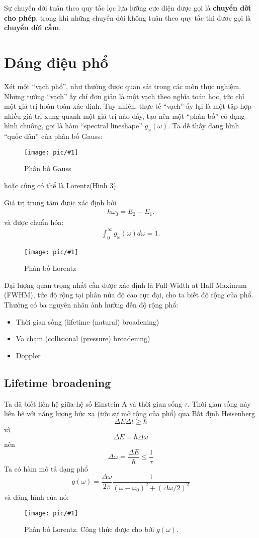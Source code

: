 \documentclass{article}
\newcommand{\image}[2]{
	\begin{figure}[h!]
		\centering
		\texttt{[image: pic/\#1]}
		\caption{#2}
	\end{figure}
}
\begin{document}
Sự chuyển dời tuân theo quy tắc lọc lựa lưỡng cực điện được gọi là \textbf{chuyển dời cho phép}, trong khi những chuyển dời không tuân theo quy tắc thì đươc gọi là \textbf{chuyển dời cấm}.

\section{Dáng điệu phổ}

Xét một ``vạch phổ'', như thường được quan sát trong các môn thực nghiệm. Những tưởng ``vạch'' ấy chỉ đơn giản là một vạch theo nghĩa toán học, tức chỉ một giá trị hoàn toàn xác định. Tuy nhiên, thực tế ``vạch'' ấy lại là một tập hợp nhiều giá trị xung quanh một giá trị nào đấy, tạo nên một ``phân bố'' có dạng hình chuông, gọi là hàm ``spectral lineshape'' $g_\omega(\omega)$.
Ta dễ thấy dạng hình ``quốc dân'' của phân bố Gauss:
\image{gauss.jpg}{Phân bố Gauss}

hoặc cũng có thể là Lorentz(Hình 3).

Giá trị trung tâm được xác định bởi 
\begin{align*}
	\hbar\omega_0 = E_2 - E_1.
\end{align*} 
và được chuẩn hóa:
\begin{align*}
	\int_{0}^{\infty}g_\omega(\omega)d\omega = 1.
\end{align*}

\image{cauchy.png}{Phân bố Lorentz}

Đại lượng quan trọng nhất cần được xác định là Full Width at Half Maximum (FWHM), tức độ rộng tại phân nửa độ cao cực đại, cho ta biết độ rộng của phổ.\\
Thường có ba nguyên nhân ảnh hưởng đến độ rộng phổ:
\begin{itemize}
	\item Thời gian sống (lifetime (natural) broadening)
	\item Va chạm (collisional (pressure) broadening)
	\item Doppler
\end{itemize}
\subsection{Lifetime broadening}
Ta đã biết liên hệ giữa hệ số Einstein A và thời gian sống $\tau$. Thời gian sống này liên hệ với năng lượng bức xạ (tức sự mở rộng của phổ) qua Bất định Heisenberg $$\Delta E\Delta t \geq \hbar$$
và $$\Delta E = \hbar\Delta\omega$$
nên $$\Delta \omega=\frac{\Delta E}{\hbar} \leq \frac{1}{\tau}$$
Ta có hàm mô tả dạng phổ $$g(\omega) = \frac{\Delta\omega}{2\pi} \frac{1}{(\omega - \omega_0)^2 + (\Delta\omega/2)^2}$$
và dáng hình của nó:
\image{g(w).png}{Phân bố Lorentz. Công thức được cho bởi $g(\omega)$.}
\end{document}
